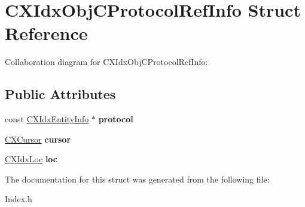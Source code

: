 \hypertarget{structCXIdxObjCProtocolRefInfo}{}\section{C\+X\+Idx\+Obj\+C\+Protocol\+Ref\+Info Struct Reference}
\label{structCXIdxObjCProtocolRefInfo}


Collaboration diagram for C\+X\+Idx\+Obj\+C\+Protocol\+Ref\+Info\+:
\subsection*{Public Attributes}
\begin{DoxyCompactItemize}
\item 
\mbox{\label{structCXIdxObjCProtocolRefInfo_a3ea0012d6a535e26e288832ac9c8edc6}} 
const \hyperlink{structCXIdxEntityInfo}{C\+X\+Idx\+Entity\+Info} $\ast$ {\bfseries protocol}
\item 
\mbox{\label{structCXIdxObjCProtocolRefInfo_a580772bbae5a1af9f6ade5ee7196f2b4}} 
\hyperlink{structCXCursor}{C\+X\+Cursor} {\bfseries cursor}
\item 
\mbox{\label{structCXIdxObjCProtocolRefInfo_ae2a2bf9b63d43c4518ce5988e77a0ec7}} 
\hyperlink{structCXIdxLoc}{C\+X\+Idx\+Loc} {\bfseries loc}
\end{DoxyCompactItemize}


The documentation for this struct was generated from the following file\+:\begin{DoxyCompactItemize}
\item 
Index.\+h\end{DoxyCompactItemize}
